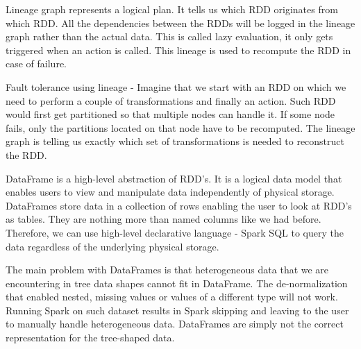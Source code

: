 Lineage graph represents a logical plan. It tells us which RDD originates from which RDD. All the dependencies between the RDDs will be logged in the lineage graph rather than the actual data. This is called lazy evaluation, it only gets triggered when an action is called. This lineage is used to recompute the RDD in case of failure.

Fault tolerance using lineage - Imagine that we start with an RDD on which we need to perform a couple of transformations and finally an action. Such RDD would first get partitioned so that multiple nodes can handle it. If some node fails, only the partitions located on that node have to be recomputed. The lineage graph is telling us exactly which set of transformations is needed to reconstruct the RDD.

DataFrame is a high-level abstraction of RDD's. It is a logical data model that enables users to view and manipulate data independently of physical storage. DataFrames store data in a collection of rows enabling the user to look at RDD's as tables. They are nothing more than named columns like we had before. Therefore, we can use high-level declarative language - Spark SQL to query the data regardless of the underlying physical storage.

The main problem with DataFrames is that heterogeneous data that we are encountering in tree data shapes cannot fit in DataFrame. The de-normalization that enabled nested, missing values or values of a different type will not work. Running Spark on such dataset results in Spark skipping and leaving to the user to manually handle heterogeneous data. DataFrames are simply not the correct representation for the tree-shaped data. 

